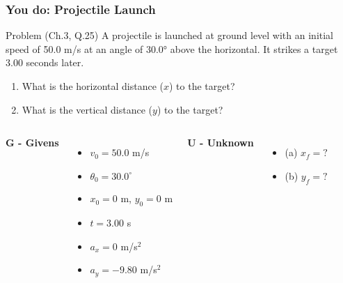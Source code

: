 \documentclass{beamer}
\begin{document}
\begin{frame}
\frametitle{You do: Projectile Launch}
\begin{block}{Problem (Ch.3, Q.25)}
A projectile is launched at ground level with an initial speed of 50.0 m/s at an angle of 30.0° above the horizontal. It strikes a target 3.00 seconds later.
\begin{enumerate}
    \item What is the horizontal distance ($x$) to the target?
    \item What is the vertical distance ($y$) to the target?
\end{enumerate}
\end{block}
\pause
\begin{columns}[T]
\textbf{G - Givens}
\begin{itemize}
\item $v_0 = 50.0$ m/s
\item $\theta_0 = 30.0^\circ$
\item $x_0 = 0$ m, $y_0 = 0$ m
\item $t = 3.00$ s
\item $a_x = 0$ m/s$^2$
\item $a_y = -9.80$ m/s$^2$
\end{itemize}
\pause
{}
\textbf{U - Unknown}
\begin{itemize}
\item (a) $x_f = ?$
\item (b) $y_f = ?$
\end{itemize}
\end{columns}
\end{frame}
\end{document}
